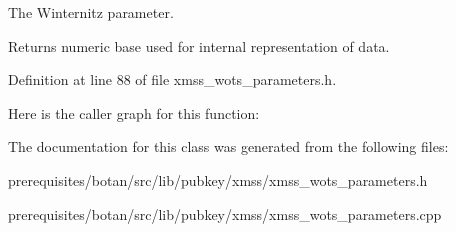 The Winternitz parameter.

\begin{DoxyReturn}{Returns}
numeric base used for internal representation of data. 
\end{DoxyReturn}


Definition at line 88 of file xmss\+\_\+wots\+\_\+parameters.\+h.

Here is the caller graph for this function\+:


The documentation for this class was generated from the following files\+:\begin{DoxyCompactItemize}
\item 
prerequisites/botan/src/lib/pubkey/xmss/xmss\+\_\+wots\+\_\+parameters.\+h\item 
prerequisites/botan/src/lib/pubkey/xmss/xmss\+\_\+wots\+\_\+parameters.\+cpp\end{DoxyCompactItemize}
